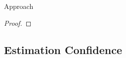 \begin{section}{Approach}
\begin{proof}
\end{proof}










	

\subsection{Estimation Confidence} 


\end{section}

